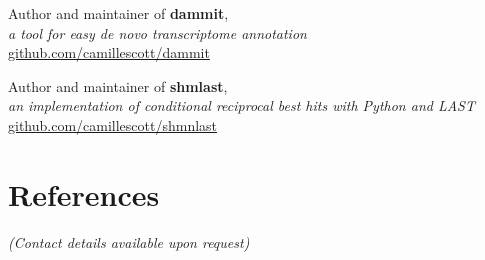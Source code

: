 \documentclass[margin,12pt]{camille_resume}
\begin{document}
\begin{resume}
\begin{list1}
\item[] Author and maintainer of {\bf dammit},\\
{\em a tool for easy de novo transcriptome annotation}\\
\hfill \href{https://github.com/camillescott/dammit}{github.com/camillescott/dammit}\\

\item[] Author and maintainer of {\bf shmlast},\\
{\em an implementation of conditional reciprocal best hits with Python and LAST}\\
\hfill \href{https://github.com/camillescott/shmlast}{github.com/camillescott/shmnlast}\\

\end{list1}


\section{\mysidestyle References}

{\em (Contact details available upon request)}

\end{resume}
\end{document}
